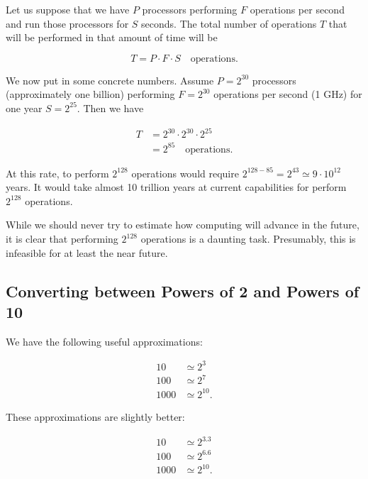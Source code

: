 \begin{example}
Let us suppose that we have $P$ processors
performing $F$ operations per second and run those processors for $S$ seconds.
The total number of operations $T$ that will be performed
in that amount of time will be

\begin{equation}
    T = P\cdot F\cdot S \quad\text{operations.}
\end{equation}

We now put in some concrete numbers.
Assume $P = 2^{30}$ processors (approximately one billion)
performing $F = 2^{30}$ operations per second (1 GHz)
for one year $S = 2^{25}$.
Then we have

\begin{align}
    T &= 2^{30}\cdot 2^{30} \cdot 2^{25} \nonumber\\
        &= 2^{85} \quad\text{operations.}
\end{align}

\noindent
At this rate, to perform $2^{128}$ operations would require
$2^{128-85} = 2^{43} \simeq 9\cdot10^{12}$ years.
It would take almost 10 trillion years at current capabilities
for perform $2^{128}$ operations.

While we should never try to estimate how computing will
advance in the future, it is clear that performing
$2^{128}$ operations is a daunting task.
Presumably, this is infeasible for at least the near future.
\end{example}

\subsection*{Converting between Powers of 2 and Powers of 10}

We have the following useful approximations:

\begin{align}
    10   &\simeq 2^{3} \nonumber\\
    100  &\simeq 2^{7} \nonumber\\
    1000 &\simeq 2^{10}.
\end{align}

\noindent
These approximations are slightly better:

\begin{align}
    10   &\simeq 2^{3.3} \nonumber\\
    100  &\simeq 2^{6.6} \nonumber\\
    1000 &\simeq 2^{10}.
\end{align}

